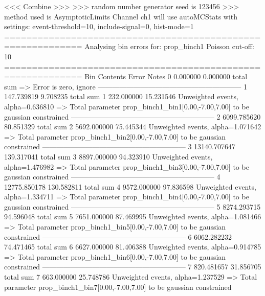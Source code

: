  <<< Combine >>> 
>>> random number generator seed is 123456
>>> method used is AsymptoticLimits
Channel ch1 will use autoMCStats with settings: event-threshold=10, include-signal=0, hist-mode=1
============================================================
Analysing bin errors for: prop_binch1
Poisson cut-off: 10
============================================================
Bin        Contents        Error           Notes                         
0          0.000000        0.000000        total sum                     
  => Error is zero, ignore      
------------------------------------------------------------
1          147.739819      9.708235        total sum                     
1          232.000000      15.231546       Unweighted events, alpha=0.636810
  => Total parameter prop_binch1_bin1[0.00,-7.00,7.00] to be gaussian constrained
------------------------------------------------------------
2          6099.785620     80.851329       total sum                     
2          5692.000000     75.445344       Unweighted events, alpha=1.071642
  => Total parameter prop_binch1_bin2[0.00,-7.00,7.00] to be gaussian constrained
------------------------------------------------------------
3          13140.707647    139.317041      total sum                     
3          8897.000000     94.323910       Unweighted events, alpha=1.476982
  => Total parameter prop_binch1_bin3[0.00,-7.00,7.00] to be gaussian constrained
------------------------------------------------------------
4          12775.850178    130.582811      total sum                     
4          9572.000000     97.836598       Unweighted events, alpha=1.334711
  => Total parameter prop_binch1_bin4[0.00,-7.00,7.00] to be gaussian constrained
------------------------------------------------------------
5          8274.293715     94.596048       total sum                     
5          7651.000000     87.469995       Unweighted events, alpha=1.081466
  => Total parameter prop_binch1_bin5[0.00,-7.00,7.00] to be gaussian constrained
------------------------------------------------------------
6          6062.282232     74.471465       total sum                     
6          6627.000000     81.406388       Unweighted events, alpha=0.914785
  => Total parameter prop_binch1_bin6[0.00,-7.00,7.00] to be gaussian constrained
------------------------------------------------------------
7          820.481657      31.856705       total sum                     
7          663.000000      25.748786       Unweighted events, alpha=1.237529
  => Total parameter prop_binch1_bin7[0.00,-7.00,7.00] to be gaussian constrained
